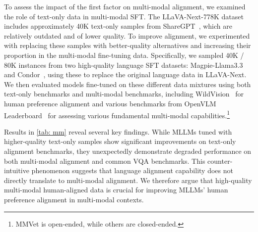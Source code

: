 To assess the impact of the first factor on multi-modal alignment, we examined the role of text-only data in multi-modal SFT.
The LLaVA-Next-778K dataset includes approximately 40K text-only samples from ShareGPT~\cite{vicuna2023}, which are relatively outdated and of lower quality. 
To improve alignment, we experimented with replacing these samples with better-quality alternatives and increasing their proportion in the multi-modal fine-tuning data. 
Specifically, we sampled 40K / 80K instances from two high-quality language SFT datasets: Magpie-Llama3.3~\cite{xu2024magpie} and Condor~\cite{cao2025condor}, using these to replace the original language data in LLaVA-Next. 
We then evaluated models fine-tuned on these different data mixtures using both text-only benchmarks and multi-modal benchmarks, including WildVision~\cite{lu2024wildvision} for human preference alignment and various benchmarks from OpenVLM Leaderboard~\cite{duan2024vlmevalkit} for assessing various fundamental multi-modal capabilities.\footnote{MMVet is open-ended, while others are closed-ended. } 





Results in \cref{tab: mm} reveal several key findings. 
While MLLMs tuned with higher-quality text-only samples show significant improvements on text-only alignment benchmarks, 
they unexpectedly demonstrate degraded performance on both multi-modal alignment and common VQA benchmarks. 
This counter-intuitive phenomenon suggests that language alignment capability does not directly translate to multi-modal alignment. 
We therefore argue that high-quality multi-modal human-aligned data is crucial for improving MLLMs' human preference alignment in multi-modal contexts.


